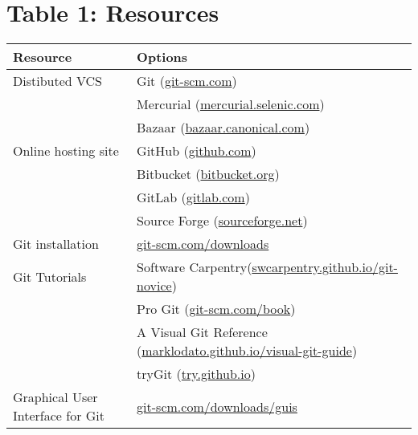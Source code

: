 \section*{Table 1: Resources}

\begin{tabular}{|l|l|}
    \hline
    \textbf{Resource} & \textbf{Options} \\ \hline
    Distibuted VCS & Git (\href{https://git-scm.com}{git-scm.com}) \\ \hline
                   & Mercurial (\href{https://mercurial.selenic.com}{mercurial.selenic.com}) \\ \hline
                   & Bazaar (\href{http://bazaar.canonical.com}{bazaar.canonical.com}) \\ \hline
    Online hosting site & GitHub (\href{https://github.com}{github.com}) \\ \hline
                        & Bitbucket (\href{https://bitbucket.org}{bitbucket.org}) \\ \hline
                        & GitLab (\href{https://about.gitlab.com}{gitlab.com}) \\ \hline
                        & Source Forge (\href{http://sourceforge.net}{sourceforge.net}) \\ \hline
    Git installation & \href{https://git-scm.com/downloads}{git-scm.com/downloads} \\ \hline
    Git Tutorials & Software Carpentry(\href{https://swcarpentry.github.io/git-novice}{swcarpentry.github.io/git-novice}) \\ \hline
                  & Pro Git (\href{https://git-scm.com/book}{git-scm.com/book}) \\ \hline
                  & A Visual Git Reference (\href{https://marklodato.github.io/visual-git-guide}{marklodato.github.io/visual-git-guide}) \\ \hline
                  & tryGit (\href{https://try.github.io}{try.github.io}) \\ \hline
    Graphical User Interface for Git & \href{https://git-scm.com/downloads/guis}{git-scm.com/downloads/guis} \\ \hline
\end{tabular}

